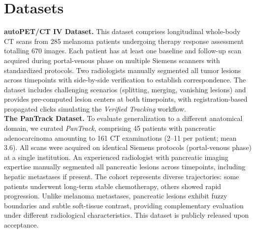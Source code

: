 \section{Datasets}


\noindent \textbf{autoPET/CT IV Dataset.} This dataset comprises longitudinal whole-body CT scans from 285 melanoma patients undergoing therapy response assessment~\cite{kuestner2025longitudinalct} totalling 670 images. Each patient has at least one baseline and follow-up scan acquired during portal-venous phase on multiple Siemens scanners with standardized protocols. Two radiologists manually segmented all tumor lesions across timepoints with side-by-side verification to establish correspondence. The dataset includes challenging scenarios (splitting, merging, vanishing lesions) and provides pre-computed lesion centers at both timepoints, with registration-based propagated clicks simulating the \textit{Verified Tracking} workflow.\\

\noindent \noindent \textbf{The PanTrack Dataset.} To evaluate generalization to a different anatomical domain, we curated \textit{PanTrack}, comprising 45 patients with pancreatic adenocarcinoma amounting to 161 CT examinations (2–11 per patient; mean 3.6). All scans were acquired on identical Siemens protocols (portal-venous phase) at a single institution. An experienced radiologist with pancreatic imaging expertise manually segmented all pancreatic lesions across timepoints, including hepatic metastases if present. The cohort represents diverse trajectories: some patients underwent long-term stable chemotherapy, others showed rapid progression. Unlike melanoma metastases, pancreatic lesions exhibit fuzzy boundaries and subtle soft-tissue contrast, providing complementary evaluation under different radiological characteristics. This dataset is publicly released upon acceptance.